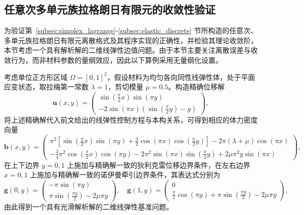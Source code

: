 

\subsection{任意次多单元族拉格朗日有限元的收敛性验证}
\label{subsec:fem_verification}

为验证第~\ref{subsec:simplex_lagrange}-\ref{subsec:elastic_discrete} 节所构造的任意次、多单元族拉格朗日有限元离散格式及其程序实现的正确性，并检验其理论收敛阶，本节考虑一个具有解析解的二维线弹性边值问题。由于本节主要关注离散误差与收敛行为，而非材料参数的量纲效应，因此以下算例采用无量纲化设置。

考虑单位正方形区域 $\Omega = [0,1]^2$，假设材料为均匀各向同性线弹性体，处于平面应变状态，取拉梅第一常数 $\lambda=1$，剪切模量 $\mu = 0.5$。构造精确位移解
\[
\boldsymbol{u}(x,y) = 
\begin{pmatrix} 
	\sin(\frac{\pi}{2}x)\sin(\pi{y})\\ -2\sin(\pi{x})(\sin(\frac{\pi}{2}{y})-y) 
\end{pmatrix},
\]
将上述精确解代入前文给出的线弹性控制方程与本构关系，可得到相应的体力密度向量
\[
\boldsymbol{b}(x,y) = 
\begin{pmatrix}
	\pi^2[\sin(\frac{\pi}{2}x)\sin(\pi{y}) +  \frac{3}{2}\cos(\pi{x})\cos(\frac{\pi}{2}y)] - 2\pi(\lambda+\mu)\cos(\pi{x})\\
	-\frac{3}{4}\pi^2\cos(\frac{\pi}{2}x)\cos({\pi}{y}) - 2\pi^2\sin(\pi{x})\sin(\frac{\pi}{2}y)+2\mu\pi^2y\sin(\pi{x}) 
\end{pmatrix},
\]
在上下边界 $y=0,1$ 上施加与精确解一致的狄利克雷位移边界条件，在左右边界 $x=0,1$ 上施加与精确解一致的诺伊曼牵引边界条件，其表达式分别为
\[
\boldsymbol{g}(0,y) = 
\begin{pmatrix}
	-\pi\sin(\pi{y})\\
	\pi\sin(\frac{\pi{y}}{2})-2\mu\pi{y}
\end{pmatrix},\quad
\boldsymbol{g}(1,y) = 
\begin{pmatrix}
	0\\
	\frac{\pi}{2}\cos(\pi{y})+\pi\sin(\frac{\pi{y}}{2})-2\mu\pi{y}
\end{pmatrix},
\]
由此得到一个具有光滑解析解的二维线弹性基准问题。

